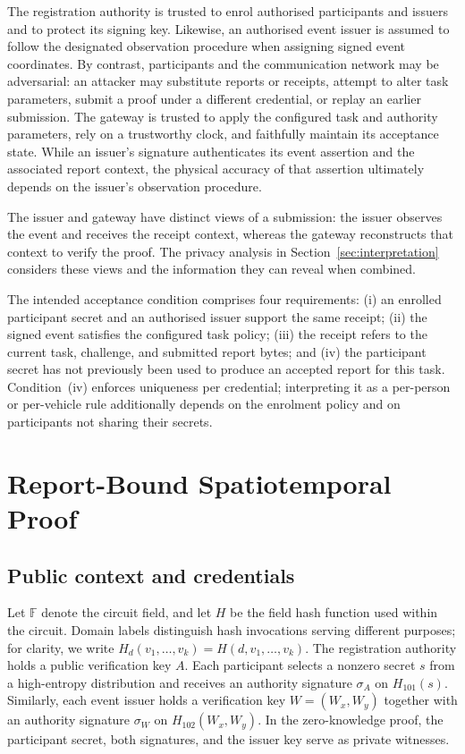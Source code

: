 \documentclass[pdflatex,iicol,sn-mathphys-num]{sn-jnl}
\begin{document}
The registration authority is trusted to enrol authorised participants and issuers and to protect its signing key. Likewise, an authorised event issuer is assumed to follow the designated observation procedure when assigning signed event coordinates. By contrast, participants and the communication network may be adversarial: an attacker may substitute reports or receipts, attempt to alter task parameters, submit a proof under a different credential, or replay an earlier submission. The gateway is trusted to apply the configured task and authority parameters, rely on a trustworthy clock, and faithfully maintain its acceptance state. While an issuer's signature authenticates its event assertion and the associated report context, the physical accuracy of that assertion ultimately depends on the issuer's observation procedure.

The issuer and gateway have distinct views of a submission: the issuer observes the event and receives the receipt context, whereas the gateway reconstructs that context to verify the proof. The privacy analysis in Section~\ref{sec:interpretation} considers these views and the information they can reveal when combined.

The intended acceptance condition comprises four requirements: (i) an enrolled participant secret and an authorised issuer support the same receipt; (ii) the signed event satisfies the configured task policy; (iii) the receipt refers to the current task, challenge, and submitted report bytes; and (iv) the participant secret has not previously been used to produce an accepted report for this task. Condition~(iv) enforces uniqueness per credential; interpreting it as a per-person or per-vehicle rule additionally depends on the enrolment policy and on participants not sharing their secrets.

\section{Report-Bound Spatiotemporal Proof}
\label{sec:protocol}

\subsection{Public context and credentials}
\label{sec:context}

Let $\mathbb F$ denote the circuit field, and let $H$ be the field hash function used within the circuit. Domain labels distinguish hash invocations serving different purposes; for clarity, we write $H_d(v_1,\ldots,v_k)=H(d,v_1,\ldots,v_k)$. The registration authority holds a public verification key $A$. Each participant selects a nonzero secret $s$ from a high-entropy distribution and receives an authority signature $\sigma_A$ on $H_{101}(s)$. Similarly, each event issuer holds a verification key $W=(W_x,W_y)$ together with an authority signature $\sigma_W$ on $H_{102}(W_x,W_y)$. In the zero-knowledge proof, the participant secret, both signatures, and the issuer key serve as private witnesses.
\end{document}
